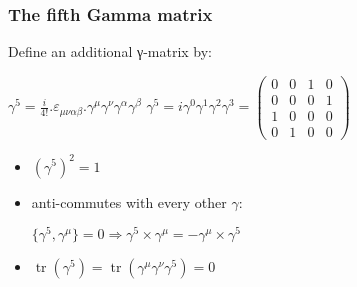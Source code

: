 \label{The fifth Gamma matrix}
\begin{frame}\frametitle{The fifth Gamma matrix}

Define an additional γ-matrix by:\\

\begin{center}
 $\gamma ^{5}={\frac {i}{4!}} . \varepsilon _{\mu \nu \alpha \beta }.\gamma ^{\mu }\gamma ^{\nu }\gamma ^{\alpha }\gamma ^{\beta }$
\newline\newline
$ \gamma ^{5}=i \gamma^{0} \gamma^{1} \gamma^{2} \gamma^{3} ={\begin{pmatrix}0&0&1&0\\0&0&0&1\\1&0&0&0\\0&1&0&0\end{pmatrix}}$

 
\end{center}


\begin{itemize}
 \item  $(\gamma^5)^2 = 1$
\item anti-commutes with every other $\gamma$:
\begin{center}
	$\{\gamma^5,\gamma^\mu\}=0 \Longrightarrow \gamma^5\times \gamma^\mu = - \gamma^\mu \times \gamma^5 $
\end{center}
 



\item
$\operatorname {tr} \left(\gamma ^{5}\right)=\operatorname {tr} \left(\gamma ^{\mu }\gamma ^{\nu }\gamma ^{5}\right)=0$
\end{itemize}

\end{frame}



\label{The fifth Gamma matrix}

